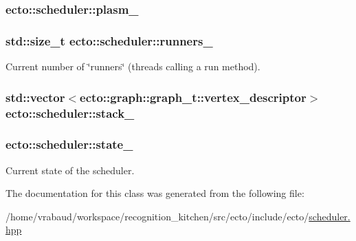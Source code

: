 \subsubsection[{plasm\+\_\+}]{ ecto\+::scheduler\+::plasm\+\_\+\hspace{0.3cm}{\ttfamily [private]}}\label{classecto_1_1scheduler_a9ccfb508a5bf75ec7ca69b475a7c7226}
\hypertarget{classecto_1_1scheduler_a650d97445fe90ba4572d208430f71e20}{}
\subsubsection[{runners\+\_\+}]{\setlength{\rightskip}{0pt plus 5cm}std\+::size\+\_\+t ecto\+::scheduler\+::runners\+\_\+\hspace{0.3cm}{\ttfamily [private]}}\label{classecto_1_1scheduler_a650d97445fe90ba4572d208430f71e20}


Current number of \char`\"{}runners\char`\"{} (threads calling a run method). 

\hypertarget{classecto_1_1scheduler_ad2b6561ebc08afd8cf8edaa39cb702b8}{}
\subsubsection[{stack\+\_\+}]{\setlength{\rightskip}{0pt plus 5cm}std\+::vector$<$ecto\+::graph\+::graph\+\_\+t\+::vertex\+\_\+descriptor$>$ ecto\+::scheduler\+::stack\+\_\+\hspace{0.3cm}{\ttfamily [private]}}\label{classecto_1_1scheduler_ad2b6561ebc08afd8cf8edaa39cb702b8}
\hypertarget{classecto_1_1scheduler_a21d2aac4a8a2ef665942b7c9b741250c}{}
\subsubsection[{state\+\_\+}]{ ecto\+::scheduler\+::state\+\_\+\hspace{0.3cm}{\ttfamily [private]}}\label{classecto_1_1scheduler_a21d2aac4a8a2ef665942b7c9b741250c}


Current state of the scheduler. 



The documentation for this class was generated from the following file\+:\begin{DoxyCompactItemize}
\item 
/home/vrabaud/workspace/recognition\+\_\+kitchen/src/ecto/include/ecto/\hyperlink{scheduler_8hpp}{scheduler.\+hpp}\end{DoxyCompactItemize}
